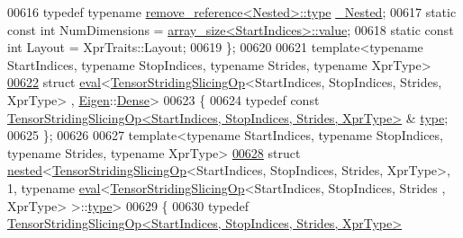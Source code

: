 \begin{DoxyCode}
00616   \textcolor{keyword}{typedef} \textcolor{keyword}{typename} \hyperlink{group___sparse_core___module}{remove\_reference<Nested>::type} 
      \hyperlink{group___sparse_core___module}{\_Nested};
00617   \textcolor{keyword}{static} \textcolor{keyword}{const} \textcolor{keywordtype}{int} NumDimensions = \hyperlink{struct_eigen_1_1internal_1_1array__size}{array\_size<StartIndices>::value};
00618   \textcolor{keyword}{static} \textcolor{keyword}{const} \textcolor{keywordtype}{int} Layout = XprTraits::Layout;
00619 \};
00620 
00621 \textcolor{keyword}{template}<\textcolor{keyword}{typename} StartIndices, \textcolor{keyword}{typename} StopIndices, \textcolor{keyword}{typename} Str\textcolor{keywordtype}{id}es, \textcolor{keyword}{typename} XprType>
\hyperlink{struct_eigen_1_1internal_1_1eval_3_01_tensor_striding_slicing_op_3_01_start_indices_00_01_stop_i633f894d67a61646d554d84693f3012b}{00622} \textcolor{keyword}{struct }\hyperlink{struct_eigen_1_1internal_1_1eval}{eval}<\hyperlink{class_eigen_1_1_tensor_striding_slicing_op}{TensorStridingSlicingOp}<StartIndices, StopIndices, Strides, XprType>
      , \hyperlink{namespace_eigen}{Eigen}::\hyperlink{struct_eigen_1_1_dense}{Dense}>
00623 \{
00624   \textcolor{keyword}{typedef} \textcolor{keyword}{const} 
      \hyperlink{class_eigen_1_1_tensor_striding_slicing_op}{TensorStridingSlicingOp<StartIndices, StopIndices, Strides, XprType>}
      & \hyperlink{class_eigen_1_1_tensor_striding_slicing_op}{type};
00625 \};
00626 
00627 \textcolor{keyword}{template}<\textcolor{keyword}{typename} StartIndices, \textcolor{keyword}{typename} StopIndices, \textcolor{keyword}{typename} Str\textcolor{keywordtype}{id}es, \textcolor{keyword}{typename} XprType>
\hyperlink{struct_eigen_1_1internal_1_1nested_3_01_tensor_striding_slicing_op_3_01_start_indices_00_01_stopc629a6763d7f6c225084b7a41b6d4822}{00628} \textcolor{keyword}{struct }\hyperlink{struct_eigen_1_1internal_1_1nested}{nested}<\hyperlink{class_eigen_1_1_tensor_striding_slicing_op}{TensorStridingSlicingOp}<StartIndices, StopIndices, Strides, 
      XprType>, 1, typename \hyperlink{struct_eigen_1_1internal_1_1eval}{eval}<\hyperlink{class_eigen_1_1_tensor_striding_slicing_op}{TensorStridingSlicingOp}<StartIndices, StopIndices, Strides
      , XprType> >::\hyperlink{class_eigen_1_1_tensor_striding_slicing_op}{type}>
00629 \{
00630   \textcolor{keyword}{typedef} \hyperlink{class_eigen_1_1_tensor_striding_slicing_op}{TensorStridingSlicingOp<StartIndices, StopIndices, Strides, XprType>}

\end{DoxyCode}
